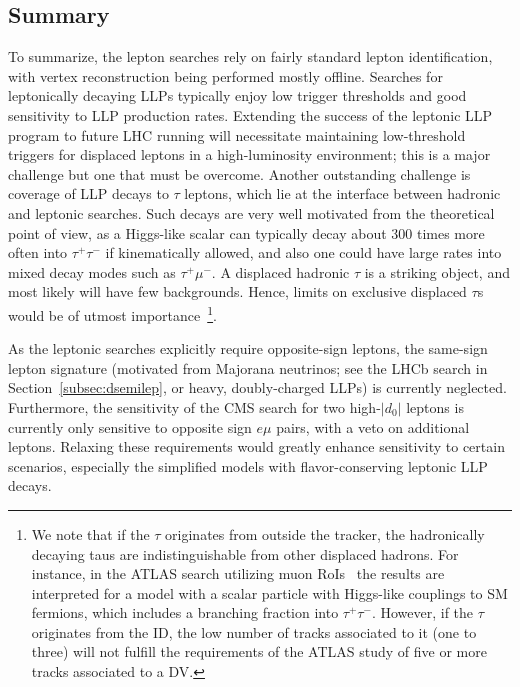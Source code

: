 {\subsection{Summary}
\label{sec:leptonicsummary}

To summarize, the lepton searches rely on fairly standard lepton identification, with vertex reconstruction being performed mostly offline. Searches for leptonically decaying LLPs typically enjoy low trigger thresholds and good sensitivity to LLP production rates. Extending the success of the leptonic LLP program to future LHC running will necessitate maintaining low-threshold triggers for displaced leptons in a high-luminosity environment; this is a major challenge but one that must be overcome. Another outstanding challenge is coverage of LLP decays to $\tau$ leptons, which lie at the interface between hadronic and leptonic searches. Such decays are very well motivated from the theoretical point of view, as a Higgs-like scalar can typically decay about 300 times more often into $\tau^+ \tau^-$ if kinematically allowed, and also one could have large rates into mixed decay modes such as $\tau^+ \mu^-$. A displaced hadronic $\tau$ is a striking object, and most likely will have few backgrounds. Hence, limits on exclusive displaced $\tau$s would be of utmost importance~\footnote{We note that if the $\tau$ originates from outside the tracker, the hadronically decaying taus are indistinguishable from other displaced hadrons. For instance, in the ATLAS search utilizing muon RoIs~\cite{Aad:2015uaa} the results are interpreted for a model with a scalar particle with Higgs-like couplings to SM fermions, which includes a branching fraction into $\tau^+ \tau^-$. However, if the $\tau$ originates from the ID, the low number of tracks associated to it (one to three) will not fulfill the requirements of the ATLAS study of five or more tracks associated to a DV.}.

As the leptonic searches explicitly require opposite-sign leptons, the same-sign lepton signature (motivated from Majorana neutrinos; see the LHCb search in Section~\ref{subsec:dsemilep}, or heavy, doubly-charged LLPs) is currently neglected. Furthermore, the sensitivity of the CMS search for two high-$|d_0|$ leptons is currently only sensitive to opposite sign $e\mu$ pairs, with a veto on additional leptons. Relaxing these requirements would greatly enhance sensitivity to certain scenarios, especially the simplified models with flavor-conserving leptonic LLP decays.

}
